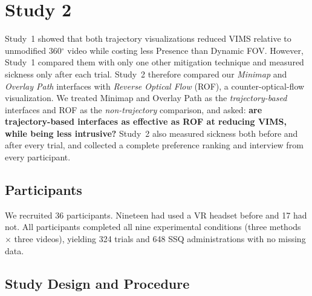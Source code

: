 
\section{Study 2}
\label{sec:study2}

Study~1 showed that both trajectory visualizations reduced VIMS relative to
unmodified 360$^\circ$ video while costing less Presence than Dynamic FOV.
However, Study~1 compared them with only one other mitigation technique and
measured sickness only after each trial. Study~2 therefore compared our
\textit{Minimap} and \textit{Overlay Path} interfaces with \textit{Reverse
Optical Flow} (ROF), a counter-optical-flow visualization. We treated Minimap
and Overlay Path as the \emph{trajectory-based} interfaces and ROF as the
\emph{non-trajectory} comparison, and asked: \textbf{are trajectory-based
interfaces as effective as ROF at reducing VIMS, while being less intrusive?}
Study~2 also measured sickness both before and after every trial, and
collected a complete preference ranking and interview from every participant.

\subsection{Participants}

We recruited 36 participants. %
Nineteen had used a VR headset before and 17 had not. All participants
completed all nine experimental conditions (three methods $\times$ three
videos), yielding 324 trials and 648 SSQ administrations with no missing data.

\subsection{Study Design and Procedure}

